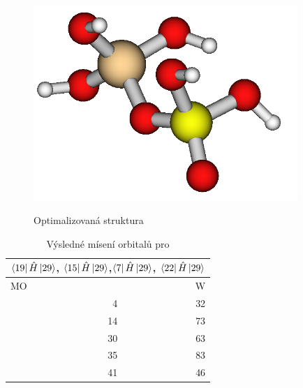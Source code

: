 \documentclass[
  digital, %
  table,   %
  lof,     %
  lot,     %
]{fithesis3}
\begin{document}
  \begin{figure}[h]
\caption{Optimalizovaná struktura  }
  \center
  \includegraphics[width=10cm]{obr_h3sio4_h2po3.png}
  \label{}
  \end{figure}

\begin{table}[htbp]
\caption{Výsledné mísení orbitalů pro  }
\begin{center}
\begin{tabular}{|r|r|}
\hline
\multicolumn{2}{|c|}{$\bra{19}{\hat{H}}\ket{29}$, $\bra{15}{\hat{H}}\ket{29}$,$\bra{7}{\hat{H}}\ket{29}$, $\bra{22}{\hat{H}}\ket{29}$} \\
\hline \hline
\multicolumn{1}{|l|}{MO} & \multicolumn{1}{r|}{W} \\ \hline
4 & 32 \\ \hline
14 & 73 \\ \hline
30 & 63 \\ \hline
35 & 83 \\ \hline
41 & 46 \\ \hline
\end{tabular}

\label{tab_sio3_vysledky}\end{center}
\end{table}
\end{document}
